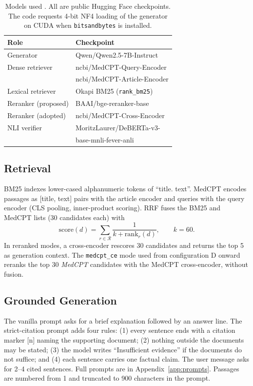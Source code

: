 \documentclass[11pt]{article}
\begin{document}
\begin{table}[t]
\centering\small
\setlength{\tabcolsep}{3pt}
\begin{tabular}{ll}
\toprule
Role & Checkpoint \\
\midrule
Generator & Qwen/Qwen2.5-7B-Instruct \\
Dense retriever & ncbi/MedCPT-Query-Encoder \\
 & ncbi/MedCPT-Article-Encoder \\
Lexical retriever & Okapi BM25 (\texttt{rank\_bm25}) \\
Reranker (proposed) & BAAI/bge-reranker-base \\
Reranker (adopted) & ncbi/MedCPT-Cross-Encoder \\
NLI verifier & MoritzLaurer/DeBERTa-v3- \\
 & \quad base-mnli-fever-anli \\
\bottomrule
\end{tabular}
\caption{Models used \citep{qwen2025qwen25,jin2023medcpt,robertson2009bm25,xiao2023cpack,he2023debertav3,laurer_deberta_nli}. All are public Hugging Face checkpoints. The code requests 4-bit NF4 loading of the generator on CUDA when \texttt{bitsandbytes} is installed.} %
\label{tab:components}
\end{table}

\subsection{Retrieval}\label{sec:retrieval}
BM25 \citep{robertson2009bm25} indexes lower-cased alphanumeric tokens of ``title. text''. MedCPT \citep{jin2023medcpt} encodes passages as [title, text] pairs with the article encoder and queries with the query encoder (CLS pooling, inner-product scoring). RRF fuses the BM25 and MedCPT lists (30 candidates each) with
\begin{equation}
\mathrm{score}(d)=\sum_{r\in\mathcal{R}}\frac{1}{k+\mathrm{rank}_r(d)},\qquad k=60 .
\end{equation}
In reranked modes, a cross-encoder rescores 30 candidates and returns the top 5 as generation context. The \texttt{medcpt\_ce} mode used from configuration D onward reranks the top 30 \emph{MedCPT} candidates with the MedCPT cross-encoder, without fusion.

\subsection{Grounded Generation}
The vanilla prompt asks for a brief explanation followed by an answer line. The strict-citation prompt adds four rules: (1) every sentence ends with a citation marker [n] naming the supporting document; (2) nothing outside the documents may be stated; (3) the model writes ``Insufficient evidence'' if the documents do not suffice; and (4) each sentence carries one factual claim. The user message asks for 2--4 cited sentences. Full prompts are in Appendix~\ref{app:prompts}. Passages are numbered from 1 and truncated to 900 characters in the prompt.
\end{document}
